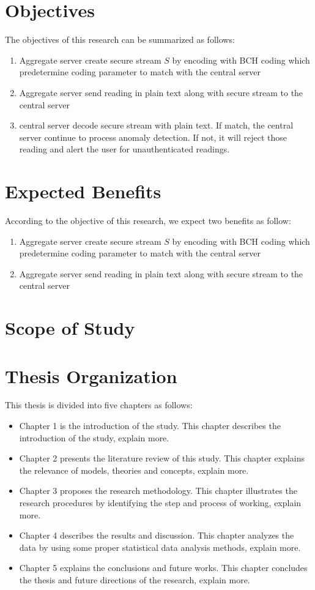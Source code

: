\section{Objectives}
The objectives of this research can be summarized as follows:
\begin{enumerate}
	\item Aggregate server create secure stream $S$ by encoding with BCH coding which predetermine coding parameter to match with the central server
	\item Aggregate server send reading in plain text along with secure stream to the central server
	\item central server decode secure stream with plain text. If match, the central server continue to process anomaly detection. If not, it will reject those reading and alert the user for unauthenticated readings.
\end{enumerate}

\section{Expected Benefits}
According to the objective of this research, we expect two benefits as follow:
\begin{enumerate}
	\item Aggregate server create secure stream $S$ by encoding with BCH coding which predetermine coding parameter to match with the central server
	\item Aggregate server send reading in plain text along with secure stream to the central server
\end{enumerate}

\section{Scope of Study}
\lipsum[1]

\section{Thesis Organization}
This thesis is divided into five chapters as follows:
\begin{itemize}
	\item Chapter 1 is the introduction of the study. This chapter describes the introduction of the study, explain more.
	\item Chapter 2 presents the literature review of this study. This chapter explains the relevance of models, theories and concepts, explain more.
	\item Chapter 3 proposes the research methodology. This chapter illustrates the research procedures by identifying the step and process of working, explain more.
	\item Chapter 4 describes the results and discussion. This chapter analyzes the data by using some proper statistical data analysis methods, explain more.
	\item Chapter 5 explains the conclusions and future works. This chapter concludes the thesis and future directions of the research, explain more.
\end{itemize}